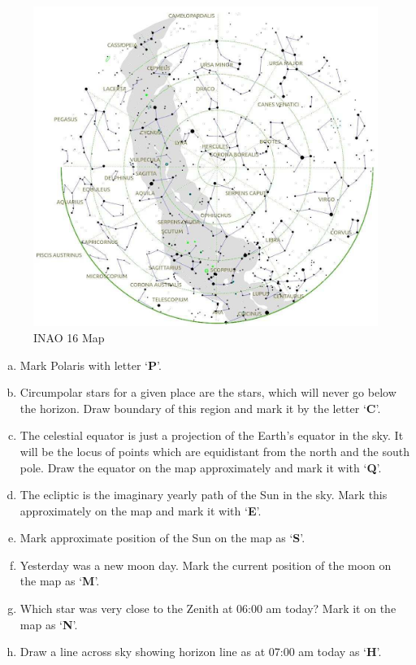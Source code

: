 \documentclass[a4paper,12pt]{extarticle}
\begin{document}
\begin{figure}[H]
	\centering
	\includegraphics[width=0.9\linewidth]{INAI_16.png}
	\caption{INAO 16 Map}
	\label{INAO16}
\end{figure}
\begin{enumerate}[a.]
	\itemsep0em 
    \item Mark Polaris with letter ‘\textbf{P}’.
    \item Circumpolar stars for a given place are the stars, which will never go below the horizon. Draw boundary of this region and mark it by the letter ‘\textbf{C}’.
    \item The celestial equator is just a projection of the Earth’s equator in the sky. It will be the locus of points which are equidistant from the north and the south pole. Draw the equator on the map approximately and mark it with ‘\textbf{Q}’.
    \item The ecliptic is the imaginary yearly path of the Sun in the sky. Mark this approximately on the map and mark it with ‘\textbf{E}’.
    \item Mark approximate position of the Sun on the map as ‘\textbf{S}’.
    \item Yesterday was a new moon day. Mark the current position of the moon on the map as ‘\textbf{M}’.
    \item Which star was very close to the Zenith at 06:00 am today? Mark it on the map as ‘\textbf{N}’.
    \item Draw a line across sky showing horizon line as at 07:00 am today as ‘\textbf{H}’.
\end{enumerate}
\end{document}
